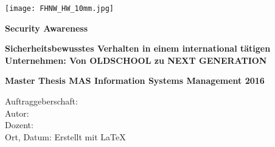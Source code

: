 
\begin{titlepage}
\texttt{[image: FHNW\_HW\_10mm.jpg]}\par
\vspace{7cm}
{\Huge\bfseries Security Awareness \par}
{\large\bfseries Sicherheitsbewusstes Verhalten in einem international tätigen \\Unternehmen: Von OLDSCHOOL zu NEXT GENERATION  \par}
\vspace{4.5cm}
{\large\bfseries Master Thesis MAS Information Systems Management 2016\par}
\vspace{1.0cm}
\TabPositions{4cm}
{\normalsize Auftraggeberschaft:    \\}
{\normalsize Autor:                  \\}
{\normalsize Dozent:                 \\}
{\normalsize Ort, Datum:            }
\vspace{2.0cm}
\vfill
{\small Erstellt mit \LaTeX}
\end{titlepage}
